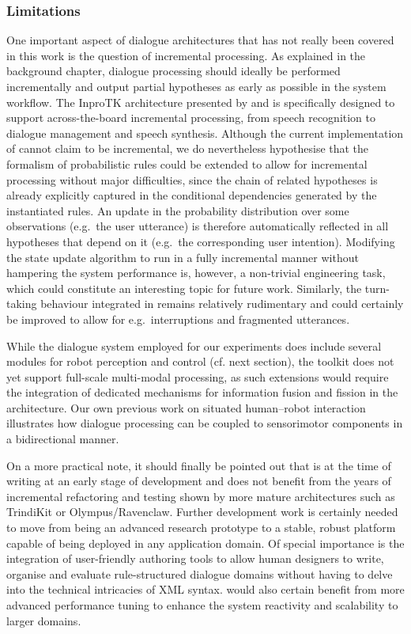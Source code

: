 \subsubsection*{Limitations}

One important aspect of dialogue architectures that has not really been covered in this work is the question of incremental processing.  As explained in the background chapter, dialogue processing should ideally be performed incrementally and output partial hypotheses as early as possible in the system workflow. The InproTK architecture presented by \cite{Baumann:2012} and \cite{baumann2013:phd} is specifically designed to support across-the-board incremental processing, from speech recognition to dialogue management and speech synthesis. Although the current implementation of \opendial{} cannot claim to be incremental, we do nevertheless hypothesise that the formalism of probabilistic rules could be extended to allow for incremental processing without major difficulties, since the chain of related hypotheses is already explicitly captured in the conditional dependencies generated by the instantiated rules.  An update in the probability distribution over some observations (e.g.\ the user utterance) is therefore automatically reflected in all hypotheses that depend on it (e.g.\ the corresponding user intention). Modifying the state update algorithm to run in a fully incremental manner without hampering the system performance is, however, a non-trivial engineering task, which could constitute an interesting topic for future work. Similarly, the turn-taking behaviour integrated in \opendial{} remains relatively rudimentary and could certainly be improved to allow for e.g.\ interruptions and fragmented utterances.

While the dialogue system employed for our experiments does include several modules for robot perception and control (cf. next section), the toolkit does not yet support full-scale multi-modal processing, as such extensions would require the integration of dedicated mechanisms for information fusion and fission in the architecture. Our own previous work on situated human--robot interaction \citep{cosybook:dialogue} illustrates how dialogue processing can be coupled to sensorimotor components in a bidirectional manner.  

On a more practical note, it should finally be pointed out that \opendial{} is at the time of writing at an early stage of development and does not benefit from the years of incremental refactoring and testing shown by more mature architectures such as TrindiKit or Olympus/Ravenclaw. Further development work is certainly needed to move \opendial{} from being an advanced research prototype to a stable, robust platform capable of being deployed in any application domain. Of special importance is the integration of user-friendly authoring tools to allow human designers to write, organise and evaluate rule-structured dialogue domains without having to delve into the technical intricacies of XML syntax. \opendial{} would also certain benefit from more advanced performance tuning to enhance the system reactivity and scalability to larger domains. 


